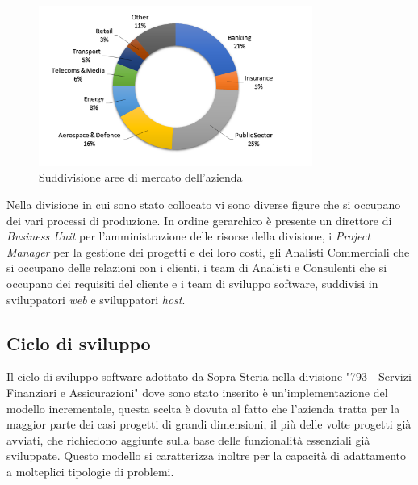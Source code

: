 	\begin{figure}[H]
	\centering
	   	\includegraphics[width=0.8\textwidth]{immagini/Mercati_Principali}
	   	\caption{Suddivisione aree di mercato dell'azienda}
	\end{figure}
	
	Nella divisione in cui sono stato collocato vi sono diverse figure che si occupano dei vari processi di produzione. In ordine gerarchico è presente un direttore di \textit{Business Unit} per l'amministrazione delle risorse della divisione, i \textit{Project Manager} per la gestione dei progetti e dei loro costi, gli Analisti Commerciali che si occupano delle relazioni con i clienti, i team di Analisti e Consulenti che si occupano dei requisiti del cliente e i team di sviluppo software, suddivisi in sviluppatori \textit{web} e sviluppatori \textit{host}.\\

	\subsection{Ciclo di sviluppo}
	
	Il ciclo di sviluppo software adottato da Sopra Steria nella divisione "793 - Servizi Finanziari e Assicurazioni" dove sono stato inserito è un'implementazione del modello incrementale, questa scelta è dovuta al fatto che l'azienda tratta per la maggior parte dei casi progetti di grandi dimensioni, il più delle volte progetti già avviati, che richiedono aggiunte sulla base delle funzionalità essenziali già sviluppate. Questo modello si caratterizza inoltre per la capacità di adattamento a molteplici tipologie di problemi.\\
	
